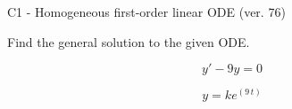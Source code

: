 \begin{exercise}
  \begin{exerciseTitle}C1 - Homogeneous first-order linear ODE (ver. 76)\end{exerciseTitle}
  \begin{exerciseStatement}
    
Find the general solution to the given ODE.

    
\[y'-9y=0\]

  \end{exerciseStatement}
  \begin{exerciseAnswer}
    
\[y= k e^{\left(9 \, t\right)}\]

  \end{exerciseAnswer}
\end{exercise}